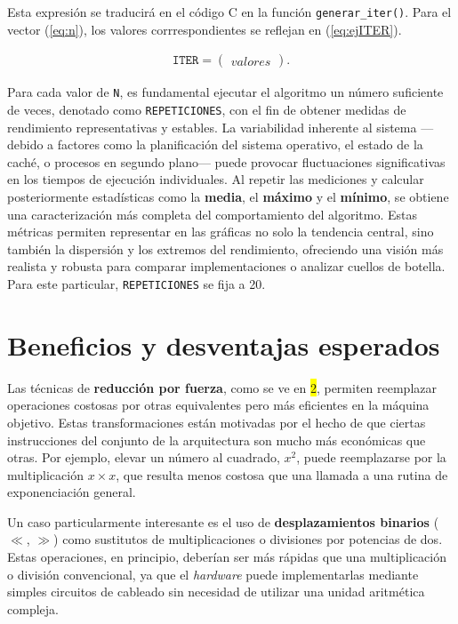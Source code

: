\documentclass[11pt,a4paper,twoside]{article}
\theoremstyle{definition}
\begin{document}
	Esta expresión se traducirá en el código C en la función \texttt{generar\_iter()}. Para el vector (\ref{eq:n}), los valores corrrespondientes se reflejan en (\ref{eq:ejITER}).
	
	\begin{equation} \label{eq:ejITER}
		\begin{aligned}
			\texttt{ITER} = \left(
			\begin{matrix}
				valores
			\end{matrix}
			\right).
		\end{aligned}
	\end{equation}

	Para cada valor de \texttt{N}, es fundamental ejecutar el algoritmo un número suficiente de veces, denotado como \texttt{REPETICIONES}, con el fin de obtener medidas de rendimiento representativas y estables. La variabilidad inherente al sistema ---debido a factores como la planificación del sistema operativo, el estado de la caché, o procesos en segundo plano--- puede provocar fluctuaciones significativas en los tiempos de ejecución individuales. Al repetir las mediciones y calcular posteriormente estadísticas como la \textbf{media}, el \textbf{máximo} y el \textbf{mínimo}, se obtiene una caracterización más completa del comportamiento del algoritmo. Estas métricas permiten representar en las gráficas no solo la tendencia central, sino también la dispersión y los extremos del rendimiento, ofreciendo una visión más realista y robusta para comparar implementaciones o analizar cuellos de botella. Para este particular, \texttt{REPETICIONES} se fija a 20.
		
	
	\section{Beneficios y desventajas esperados}
	
	Las técnicas de \textbf{reducción por fuerza}, como se ve en \colorbox{yellow}{2}, permiten reemplazar operaciones costosas por otras equivalentes pero más eficientes en la máquina objetivo. Estas transformaciones están motivadas por el hecho de que ciertas instrucciones del conjunto de la arquitectura son mucho más económicas que otras. Por ejemplo, elevar un número al cuadrado, $x^2$, puede reemplazarse por la multiplicación $x \times x$, que resulta menos costosa que una llamada a una rutina de exponenciación general.
	
	Un caso particularmente interesante es el uso de \textbf{desplazamientos binarios} ($\ll$, $\gg$) como sustitutos de multiplicaciones o divisiones por potencias de dos. Estas operaciones, en principio, deberían ser más rápidas que una multiplicación o división convencional, ya que el \textit{hardware} puede implementarlas mediante simples circuitos de cableado sin necesidad de utilizar una unidad aritmética compleja.
	
\end{document}
